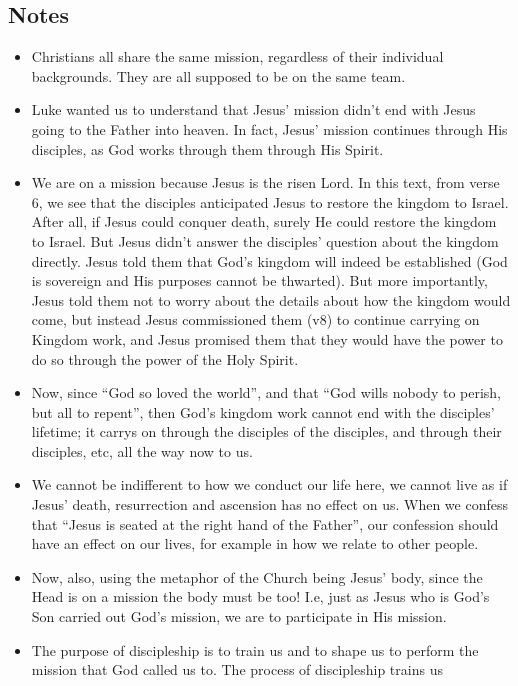 \subsection*{Notes}
\begin{itemize}
  \item{Christians all share the same mission, regardless of their individual
  backgrounds. They are all supposed to be on the same team.}
  \item{Luke wanted us to understand that Jesus' mission didn't end with
  Jesus going to the Father into heaven.  In fact, Jesus' mission continues
  through His disciples, as God works through them through His Spirit.}
  \item{We are on a mission because Jesus is the risen Lord.  In this text,
  from verse 6, we see that the disciples anticipated Jesus to restore the
  kingdom to Israel.  After all, if Jesus could conquer death, surely He
  could restore the kingdom to Israel.  But Jesus didn't answer the
  disciples' question about the kingdom directly.  Jesus told them that God's
  kingdom will indeed be established (God is sovereign and His purposes
  cannot be thwarted).  But more importantly, Jesus told them not to worry
  about the details about how the kingdom would come, but instead Jesus
  commissioned them (v8) to continue carrying on Kingdom work, and Jesus
  promised them that they would have the power to do so through the power of
  the Holy Spirit.}
  \item{Now, since ``God so loved the world'', and that ``God wills nobody to
  perish, but all to repent'', then God's kingdom work cannot end with the
  disciples' lifetime; it carrys on through the disciples of the disciples,
  and through their disciples, etc, all the way now to us.  }
  \item{We cannot be indifferent to how we conduct our life here, we cannot
  live as if Jesus' death, resurrection and ascension has no effect on us.
  When we confess that ``Jesus is seated at the right hand of the Father'',
  our confession should have an effect on our lives, for example in how we
  relate to other people.}
  \item{Now, also, using the metaphor of the Church being Jesus' body, since
  the Head is on a mission the body must be too!  I.e, just as Jesus who is
  God's Son carried out God's mission, we are to participate in His mission.}
  \item{The purpose of discipleship is to train us and to shape us to perform
  the mission that God called us to.  The process of discipleship trains us
}
\end{itemize}
